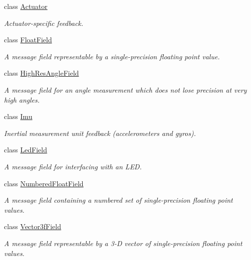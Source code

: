 \begin{DoxyCompactItemize}
\item 
class \hyperlink{classhebi_1_1Feedback_1_1Actuator}{Actuator}
\begin{DoxyCompactList}\small\item\em Actuator-\/specific feedback. \end{DoxyCompactList}\item 
class \hyperlink{classhebi_1_1Feedback_1_1FloatField}{Float\+Field}
\begin{DoxyCompactList}\small\item\em A message field representable by a single-\/precision floating point value. \end{DoxyCompactList}\item 
class \hyperlink{classhebi_1_1Feedback_1_1HighResAngleField}{High\+Res\+Angle\+Field}
\begin{DoxyCompactList}\small\item\em A message field for an angle measurement which does not lose precision at very high angles. \end{DoxyCompactList}\item 
class \hyperlink{classhebi_1_1Feedback_1_1Imu}{Imu}
\begin{DoxyCompactList}\small\item\em Inertial measurement unit feedback (accelerometers and gyros). \end{DoxyCompactList}\item 
class \hyperlink{classhebi_1_1Feedback_1_1LedField}{Led\+Field}
\begin{DoxyCompactList}\small\item\em A message field for interfacing with an L\+ED. \end{DoxyCompactList}\item 
class \hyperlink{classhebi_1_1Feedback_1_1NumberedFloatField}{Numbered\+Float\+Field}
\begin{DoxyCompactList}\small\item\em A message field containing a numbered set of single-\/precision floating point values. \end{DoxyCompactList}\item 
class \hyperlink{classhebi_1_1Feedback_1_1Vector3fField}{Vector3f\+Field}
\begin{DoxyCompactList}\small\item\em A message field representable by a 3-\/D vector of single-\/precision floating point values. \end{DoxyCompactList}\end{DoxyCompactItemize}
